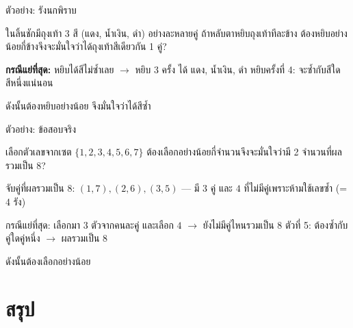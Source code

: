 \documentclass[11pt, aspectratio=169]{beamer}
\begin{document}
\begin{frame}{ตัวอย่าง: รังนกพิราบ}
  \begin{exambox}
    ในลิ้นชักมีถุงเท้า 3 สี (แดง, นํ้าเงิน, ดำ)
    อย่างละหลายคู่ ถ้าหลับตาหยิบถุงเท้าทีละข้าง
    ต้องหยิบอย่างน้อยกี่ข้างจึงจะมั่นใจว่าได้ถุงเท้าสีเดียวกัน 1 คู่?
  \end{exambox}

  \begin{solbox}[วิธีทำ]
    \textbf{กรณีแย่ที่สุด:} หยิบได้สีไม่ซํ้าเลย $\rightarrow$ หยิบ 3 ครั้ง ได้ แดง, นํ้าเงิน, ดำ
    หยิบครั้งที่ 4: จะซํ้ากับสีใดสีหนึ่งแน่นอน

    \medskip
    ดังนั้นต้องหยิบอย่างน้อย  จึงมั่นใจว่าได้สีซํ้า
  \end{solbox}
\end{frame}

\begin{frame}{ตัวอย่าง: ข้อสอบจริง}
  \begin{exambox}[โจทย์ปี 68 ข้อ 21]
    เลือกตัวเลขจากเซต $\{1, 2, 3, 4, 5, 6, 7\}$
    ต้องเลือกอย่างน้อยกี่จำนวนจึงจะมั่นใจว่ามี 2 จำนวนที่ผลรวมเป็น 8?
  \end{exambox}

  \begin{solbox}[วิธีทำ]
    จับคู่ที่ผลรวมเป็น 8: $(1,7), (2,6), (3,5)$ — มี 3 คู่ และ $4$ ที่ไม่มีคู่เพราะห้ามใช้เลขซํ้า (= 4 รัง)

    \medskip
    กรณีแย่ที่สุด: เลือกมา 3 ตัวจากคนละคู่ และเลือก $4$ $\rightarrow$ ยังไม่มีคู่ไหนรวมเป็น 8 \newline
    ตัวที่ 5: ต้องซํ้ากับคู่ใดคู่หนึ่ง $\rightarrow$ ผลรวมเป็น 8

    \medskip
    ดังนั้นต้องเลือกอย่างน้อย 
  \end{solbox}
\end{frame}

\section{สรุป}
\end{document}
